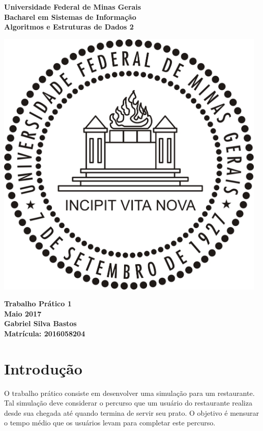 \documentclass{article}
\begin{document}
\begin{titlepage}
  \centering
  
  \vfill{
    \bfseries\Huge
    Universidade Federal de Minas Gerais\\[5pt]
    \bfseries\Large
    Bacharel em Sistemas de Informação \\
    Algoritmos e Estruturas de Dados 2\\
  }
  
  \vfill
  
  \includegraphics[width=13cm]{images/ufmg_logo.jpg}
  
  \vfill{
    \bfseries\Large
    Trabalho Prático 1\\
    Maio 2017\\
  }
  \vfill{
    \bfseries\large
    Gabriel Silva Bastos\\[5pt]
    Matrícula: 2016058204
  }
\end{titlepage}


\section{Introdução}
O trabalho prático consiste em desenvolver uma simulação para um restaurante. Tal simulação deve considerar o percurso que um usuário do restaurante realiza desde sua chegada até quando termina de servir seu prato. O objetivo é mensurar o tempo médio que os usuários levam para completar este percurso.
\end{document}
